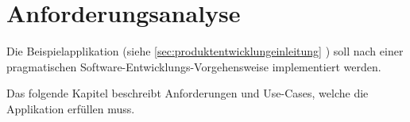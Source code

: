 \chapter{Anforderungsanalyse}

Die Beispielapplikation (siehe \ref{sec:produktentwicklungeinleitung} ) soll nach einer pragmatischen Software-Entwicklungs-Vorgehensweise implementiert werden.

Das folgende Kapitel beschreibt Anforderungen und Use-Cases, welche die Applikation erfüllen muss.




